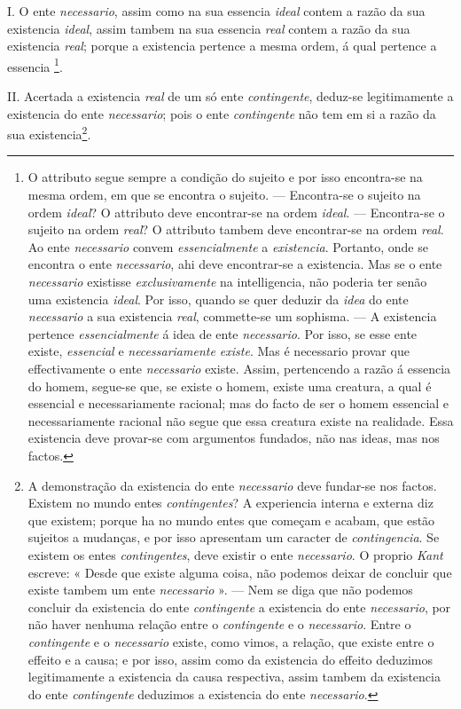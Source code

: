 I. O ente \emph{necessario}, assim como na sua essencia \emph{ideal} contem a razão da sua existencia \emph{ideal}, assim tambem na sua essencia \emph{real} contem a razão da sua existencia \emph{real}; porque a existencia pertence a mesma ordem, á qual pertence a essencia \footnote{O attributo segue sempre a condição do sujeito e por isso encontra-se na mesma ordem, em que se encontra o sujeito. --- Encontra-se o sujeito na ordem \emph{ideal}? O attributo deve encontrar-se na ordem \emph{ideal}. --- Encontra-se o sujeito na ordem \emph{real}? O attributo tambem deve encontrar-se na ordem \emph{real}. Ao ente \emph{necessario} convem \emph{essencialmente} a \emph{existencia}. Portanto, onde se encontra o ente \emph{necessario}, ahi deve encontrar-se a existencia. Mas se o ente \emph{necessario} existisse \emph{exclusivamente} na intelligencia, não poderia ter senão uma existencia \emph{ideal}. Por isso, quando se quer deduzir da \emph{idea} do ente \emph{necessario} a sua existencia \emph{real}, commette-se um sophisma. --- A existencia pertence \emph{essencialmente} á idea de ente \emph{necessario}. Por isso, se esse ente existe, \emph{essencial} e \emph{necessariamente existe}. Mas é necessario provar que effectivamente o ente \emph{necessario} existe. Assim, pertencendo a razão á essencia do homem, segue-se que, se existe o homem, existe uma creatura, a qual é essencial e necessariamente racional; mas do facto de ser o homem essencial e necessariamente racional não segue que essa creatura existe na realidade. Essa existencia deve provar-se com argumentos fundados, não nas ideas, mas nos factos.}.

II. Acertada a existencia \emph{real} de um só ente \emph{contingente}, deduz-se legitimamente a existencia do ente \emph{necessario}; pois o ente \emph{contingente} não tem em si a razão da sua existencia\footnote{A demonstração da existencia do ente \emph{necessario} deve fundar-se nos factos. Existem no mundo entes \emph{contingentes}? A experiencia interna e externa diz que existem; porque ha no mundo entes que começam e acabam, que estão sujeitos a mudanças, e por isso apresentam um caracter de \emph{contingencia}. Se existem os entes \emph{contingentes}, deve existir o ente \emph{necessario}. O proprio \emph{Kant} escreve: « Desde que existe alguma coisa, não podemos deixar de concluir que existe tambem um ente \emph{necessario} ». --- Nem se diga que não podemos concluir da existencia do ente \emph{contingente} a existencia do ente \emph{necessario}, por não haver nenhuma relação entre o \emph{contingente} e o \emph{necessario}. Entre o \emph{contingente} e o \emph{necessario} existe, como vimos, a relação, que existe entre o effeito e a causa; e por isso, assim como da existencia do effeito deduzimos legitimamente a existencia da causa respectiva, assim tambem da existencia do ente \emph{contingente} deduzimos a existencia do ente \emph{necessario}.}.

